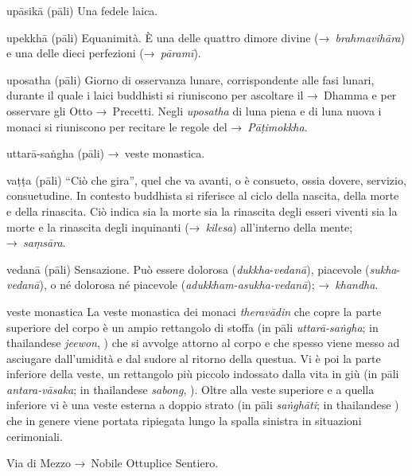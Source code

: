 \begin{glossarydescription}
\item[upāsikā] (pāli) Una fedele laica.

\item[upekkhā] (pāli) Equanimità. È una delle quattro dimore divine
  (→~\emph{brahmavihāra}) e una delle dieci perfezioni (→~\emph{pāramī}).

\item[uposatha] (pāli) Giorno di osservanza lunare, corrispondente alle fasi
  lunari, durante il quale i laici buddhisti si riuniscono per ascoltare il
  →~Dhamma e per osservare gli Otto →~Precetti. Negli \emph{uposatha} di luna
  piena e di luna nuova i monaci si riuniscono per recitare le regole del
  →~\emph{Pāṭimokkha}.

\item[uttarā-saṅgha] (pāli) →~veste monastica.


\item[vaṭṭa] (pāli) ``Ciò che gira'', quel che va avanti, o è consueto, ossia
  dovere, servizio, consuetudine. In contesto buddhista si riferisce al ciclo
  della nascita, della morte e della rinascita. Ciò indica sia la morte sia la
  rinascita degli esseri viventi sia la morte e la rinascita degli inquinanti
  (→~\emph{kilesa}) all'interno della mente; →~\emph{saṃsāra}.

\item[vedanā] (pāli)\label{glossary-vedana} Sensazione. Può essere dolorosa
  (\emph{dukkha}-\emph{vedanā}), piacevole (\emph{sukha}-\emph{vedanā}), o né
  dolorosa né piacevole (\emph{adukkham-asukha-vedanā}); →~\emph{khandha}.

\item[veste monastica] La veste monastica dei monaci \emph{theravādin} che copre
  la parte superiore del corpo è un ampio rettangolo di stoffa (in pāli
  \emph{uttarā-saṅgha}; in thailandese \emph{jeewon}, ) che si avvolge
  attorno al corpo e che spesso viene messo ad asciugare dall'umidità e dal
  sudore al ritorno della questua. Vi è poi la parte inferiore della veste, un
  rettangolo più piccolo indossato dalla vita in giù (in pāli
  \emph{antara-vāsaka}; in thailandese \emph{sabong}, ). Oltre alla
  veste superiore e a quella inferiore vi è una veste esterna a doppio strato
  (in pāli \emph{saṅghāti}; in thailandese ) che in
  genere viene portata ripiegata lungo la spalla sinistra in situazioni
  cerimoniali.

\item[Via di Mezzo] →~Nobile Ottuplice Sentiero.


\end{glossarydescription}

